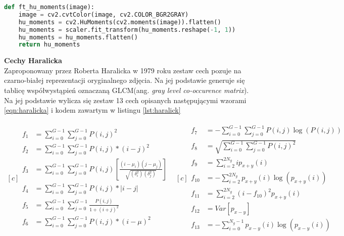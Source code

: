 \begin{lstlisting}[language=Python, caption={Kod momentów hu}, captionpos=b, label={lst:hu}]
def ft_hu_moments(image):
	image = cv2.cvtColor(image, cv2.COLOR_BGR2GRAY)
	hu_moments = cv2.HuMoments(cv2.moments(image)).flatten()
	hu_moments = scaler.fit_transform(hu_moments.reshape(-1, 1))
	hu_moments = hu_moments.flatten()
	return hu_moments
\end{lstlisting}

\textbf{Cechy Haralicka} \\

Zaproponowany przez Roberta Haralicka  w 1979 roku \cite{harlick} zestaw cech pozuje na czarno-białej reprezentacji oryginalnego zdjęcia. Na jej podstawie generuje się tablicę współwystąpień oznaczaną GLCM(ang. \textit{gray level co-occurence matrix}). Na jej podstawie wylicza się zestaw 13 cech opisanych następującymi wzorami \ref{eqn:haralicka} i kodem zawartym w listingu \ref{lst:haralick}

\begin{equation}
	\begin{aligned}[c]
		\begin{split}
			f_{1} &=\sum_{i=0}^{G-1}\sum_{j=0}^{G-1} P(i,j)^2 \\
			f_{2} &=\sum_{i=0}^{G-1}\sum_{j=0}^{G-1} P(i,j)*(i-j)^2 \\
			f_{3} &=\sum_{i=0}^{G-1}\sum_{j=0}^{G-1} P(i,j)\left [ \frac{(i-\mu_{i})(j-\mu_{j})}{\sqrt{(\delta^2_{i})(\delta^2_{j})}} \right ]\\
			f_{4} &=\sum_{i=0}^{G-1}\sum_{j=0}^{G-1} P(i,j)*\left | i-j \right | \\
			f_{5} & =\sum_{i=0}^{G-1}\sum_{j=0}^{G-1} \frac{P(i,j)}{1+(i+j)^2}\\
			f_{6} &=\sum_{i=0}^{G-1}\sum_{j=0}^{G-1} P(i,j)*(i-\mu)^2
			\end{split}
		\end{aligned}
		\begin{aligned}[c]
			\begin{split}
				f_{7} &=-\sum_{i=0}^{G-1}\sum_{j=0}^{G-1} P(i,j)\log(P(i,j))\\
				f_{8} &=\sqrt{\sum_{i=0}^{G-1}\sum_{j=0}^{G-1} P(i,j)^2 }\\
				f_{9} &=\sum_{i=2}^{2N_{g}}ip_{x+y}(i)\\
				f_{10} &=-\sum_{i=2}^{2N_{g}}p_{x+y}(i)\log(p_{x+y}(i))\\
				f_{11} &=\sum_{i=2}^{2N_{g}}(i - f_{10})^2 p_{x+y}(i)\\
				f_{12} &=Var\left [ p_{x-y} \right ]\\
				f_{13} &=-\sum_{i=0}^{N_{g}-1}p_{x-y}(i)\log(p_{x-y}(i))
			\end{split}
		\end{aligned}
	\label{eqn:haralicka}
\end{equation}

